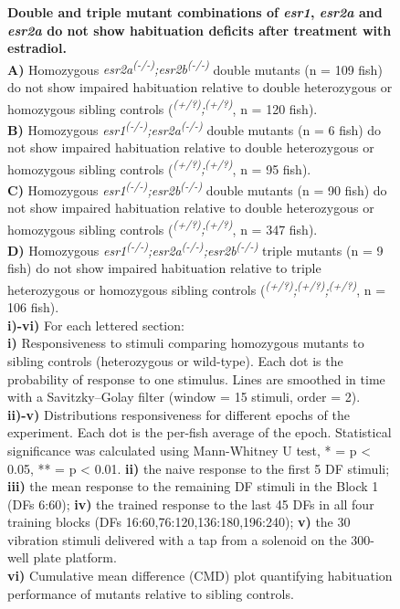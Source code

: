 \documentclass[9.5pt,lineno]{RandlettLab_elife}
\begin{document}
{\begin{figure}
\internallinenumbers

\begin{center}
\caption{ \textbf{Double and triple mutant combinations of \emph{esr1}, \emph{esr2a} and \emph{esr2a} do not show habituation deficits after treatment with estradiol.} \doublespacing
\\ \textbf{A)} Homozygous \emph{esr2a\textsuperscript{(-/-)};esr2b\textsuperscript{(-/-)}} double mutants (n = 109 fish) do not show impaired habituation relative to double heterozygous or homozygous sibling controls (\emph{\textsuperscript{(+/?)};\textsuperscript{(+/?)}}, n = 120 fish). 
\\ \textbf{B)} Homozygous \emph{esr1\textsuperscript{(-/-)};esr2a\textsuperscript{(-/-)}} double mutants (n = 6 fish) do not show impaired habituation relative to double heterozygous or homozygous sibling controls (\emph{\textsuperscript{(+/?)};\textsuperscript{(+/?)}}, n = 95 fish). 
\\ \textbf{C)} Homozygous \emph{esr1\textsuperscript{(-/-)};esr2b\textsuperscript{(-/-)}} double mutants (n = 90 fish) do not show impaired habituation relative to double heterozygous or homozygous sibling controls (\emph{\textsuperscript{(+/?)};\textsuperscript{(+/?)}}, n = 347 fish). 
\\ \textbf{D)} Homozygous \emph{esr1\textsuperscript{(-/-)};esr2a\textsuperscript{(-/-)};esr2b\textsuperscript{(-/-)}} triple mutants (n = 9 fish) do not show impaired habituation relative to triple heterozygous or homozygous sibling controls (\emph{\textsuperscript{(+/?)};\textsuperscript{(+/?)};\textsuperscript{(+/?)}}, n = 106 fish). 
\\ \textbf{i)-vi)} For each lettered section: 
\\ \textbf{i)} Responsiveness to stimuli comparing homozygous mutants to sibling controls (heterozygous or wild-type). 
Each dot is the probability of response to one stimulus. Lines are smoothed in time with a Savitzky–Golay filter (window = 15 stimuli, order = 2).
\\ \textbf{ii)-v)} Distributions responsiveness for different epochs of the experiment. Each dot is the per-fish average of the epoch. 
Statistical significance was calculated using Mann-Whitney U test, * = p < 0.05, ** = p < 0.01.
\textbf{ii)} the naive response to the first 5 DF stimuli; \textbf{iii)} the mean response to the remaining DF stimuli in the Block 1 (DFs 6:60); \textbf{iv)} the trained response to the last 45 DFs in all four training blocks (DFs 16:60,76:120,136:180,196:240); \textbf{v)} the 30 vibration stimuli delivered with a tap from a solenoid on the 300-well plate platform.
\\ \textbf{vi)} Cumulative mean difference (CMD) plot quantifying habituation performance of mutants relative to sibling controls.
}
\label{fig:4}


\end{center}
\end{figure}}
\end{document}
